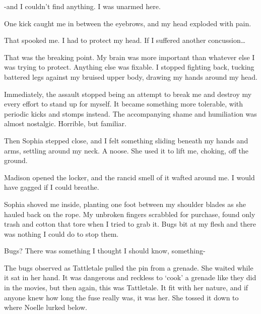 \sectionbreak



-and I couldn't find anything.  I was unarmed here.



One kick caught me in between the eyebrows, and my head exploded with pain.



That spooked me.  I had to protect my head.  If I suffered another concussion\ldots



That was the breaking point.  My brain was more important than whatever else I was trying to protect.  Anything else was fixable.  I stopped fighting back, tucking battered legs against my bruised upper body, drawing my hands around my head.



Immediately, the assault stopped being an attempt to break me and destroy my every effort to stand up for myself.  It became something more tolerable, with periodic kicks and stomps instead.  The accompanying shame and humiliation was almost nostalgic.  Horrible, but familiar.



Then Sophia stepped close, and I felt something sliding beneath my hands and arms, settling around my neck.  A noose.  She used it to lift me, choking, off the ground.



Madison opened the locker, and the rancid smell of it wafted around me.  I would have gagged if I could breathe.



Sophia shoved me inside, planting one foot between my shoulder blades as she hauled back on the rope.  My unbroken fingers scrabbled for purchase, found only trash and cotton that tore when I tried to grab it.  Bugs bit at my flesh and there was nothing I could do to stop them.



Bugs?  There was something I thought I should know, something-



\sectionbreak



The bugs observed as Tattletale pulled the pin from a grenade.  She waited while it sat in her hand.  It was dangerous and reckless to `cook' a grenade like they did in the movies, but then again, this was Tattletale.  It fit with her nature, and if anyone knew how long the fuse really was, it was her.  She tossed it down to where Noelle lurked below.




